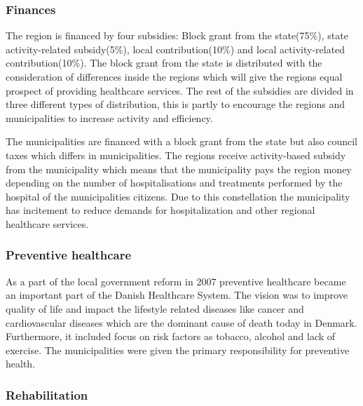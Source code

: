 





\subsubsection{Finances}

The region is financed by four subsidies: Block grant from the state(75\%), state activity-related subsidy(5\%), local contribution(10\%) and local activity-related contribution(10\%). The block grant from the state is distributed with the consideration of differences inside the regions which will give the regions equal prospect of providing healthcare services. The rest of the subsidies are divided in three different types of distribution, this is partly to encourage the regions and municipalities to increase activity and efficiency\cite{sundhedsministeriet}.

The municipalities are financed with a block grant from the state but also council taxes which differs in municipalities. The regions receive activity-based subsidy from the municipality which means that the municipality pays the region money depending on the number of hospitalisations and treatments performed by the hospital of the municipalities citizens. Due to this constellation the municipality has incitement to reduce demands for hospitalization and other regional healthcare services\cite{Healthcareindk2}.



\subsubsection{Preventive healthcare}

As a part of the local government reform in 2007 preventive healthcare became an important part of the Danish Healthcare System. The vision was to improve quality of life and impact the lifestyle related diseases like cancer and cardiovascular diseases which are the dominant cause of death today in Denmark. Furthermore, it included focus on risk factors as tobacco, alcohol and lack of exercise. The municipalities were given the primary responsibility for preventive health\cite{sundhedsministeriet}.

\subsubsection{Rehabilitation}

